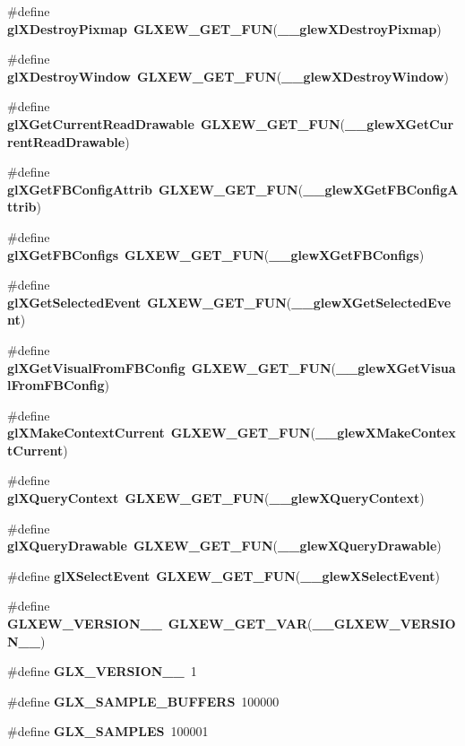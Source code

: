\begin{DoxyCompactItemize}
\item 
\#define {\bf gl\+X\+Destroy\+Pixmap}~{\bf G\+L\+X\+E\+W\+\_\+\+G\+E\+T\+\_\+\+F\+UN}({\bf \+\_\+\+\_\+glew\+X\+Destroy\+Pixmap})
\item 
\#define {\bf gl\+X\+Destroy\+Window}~{\bf G\+L\+X\+E\+W\+\_\+\+G\+E\+T\+\_\+\+F\+UN}({\bf \+\_\+\+\_\+glew\+X\+Destroy\+Window})
\item 
\#define {\bf gl\+X\+Get\+Current\+Read\+Drawable}~{\bf G\+L\+X\+E\+W\+\_\+\+G\+E\+T\+\_\+\+F\+UN}({\bf \+\_\+\+\_\+glew\+X\+Get\+Current\+Read\+Drawable})
\item 
\#define {\bf gl\+X\+Get\+F\+B\+Config\+Attrib}~{\bf G\+L\+X\+E\+W\+\_\+\+G\+E\+T\+\_\+\+F\+UN}({\bf \+\_\+\+\_\+glew\+X\+Get\+F\+B\+Config\+Attrib})
\item 
\#define {\bf gl\+X\+Get\+F\+B\+Configs}~{\bf G\+L\+X\+E\+W\+\_\+\+G\+E\+T\+\_\+\+F\+UN}({\bf \+\_\+\+\_\+glew\+X\+Get\+F\+B\+Configs})
\item 
\#define {\bf gl\+X\+Get\+Selected\+Event}~{\bf G\+L\+X\+E\+W\+\_\+\+G\+E\+T\+\_\+\+F\+UN}({\bf \+\_\+\+\_\+glew\+X\+Get\+Selected\+Event})
\item 
\#define {\bf gl\+X\+Get\+Visual\+From\+F\+B\+Config}~{\bf G\+L\+X\+E\+W\+\_\+\+G\+E\+T\+\_\+\+F\+UN}({\bf \+\_\+\+\_\+glew\+X\+Get\+Visual\+From\+F\+B\+Config})
\item 
\#define {\bf gl\+X\+Make\+Context\+Current}~{\bf G\+L\+X\+E\+W\+\_\+\+G\+E\+T\+\_\+\+F\+UN}({\bf \+\_\+\+\_\+glew\+X\+Make\+Context\+Current})
\item 
\#define {\bf gl\+X\+Query\+Context}~{\bf G\+L\+X\+E\+W\+\_\+\+G\+E\+T\+\_\+\+F\+UN}({\bf \+\_\+\+\_\+glew\+X\+Query\+Context})
\item 
\#define {\bf gl\+X\+Query\+Drawable}~{\bf G\+L\+X\+E\+W\+\_\+\+G\+E\+T\+\_\+\+F\+UN}({\bf \+\_\+\+\_\+glew\+X\+Query\+Drawable})
\item 
\#define {\bf gl\+X\+Select\+Event}~{\bf G\+L\+X\+E\+W\+\_\+\+G\+E\+T\+\_\+\+F\+UN}({\bf \+\_\+\+\_\+glew\+X\+Select\+Event})
\item 
\#define {\bf G\+L\+X\+E\+W\+\_\+\+V\+E\+R\+S\+I\+O\+N\+\_\+\_}~{\bf G\+L\+X\+E\+W\+\_\+\+G\+E\+T\+\_\+\+V\+AR}({\bf \+\_\+\+\_\+\+G\+L\+X\+E\+W\+\_\+\+V\+E\+R\+S\+I\+O\+N\+\_\+\_})
\item 
\#define {\bf G\+L\+X\+\_\+\+V\+E\+R\+S\+I\+O\+N\+\_\+\_}~1
\item 
\#define {\bf G\+L\+X\+\_\+\+S\+A\+M\+P\+L\+E\+\_\+\+B\+U\+F\+F\+E\+RS}~100000
\item 
\#define {\bf G\+L\+X\+\_\+\+S\+A\+M\+P\+L\+ES}~100001

\end{DoxyCompactItemize}

